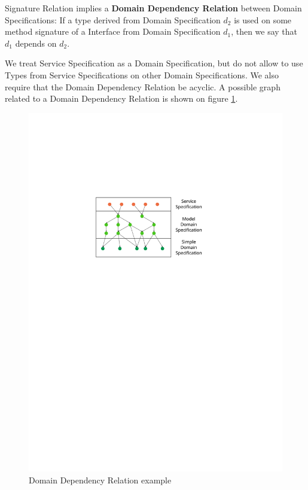 % 
% 

Signature Relation implies a \textbf{Domain Dependency Relation} between Domain Specifications: If a type derived from Domain Specification $d_2$ is used on some method signature of a Interface from Domain Specification $d_1$, then we say that $d_1$ depends on $d_2$.

We treat Service Specification as a Domain Specification, but do not allow to use Types from Service Specifications on other Domain Specifications. We also require that the Domain Dependency Relation be acyclic. A possible graph related to a Domain Dependency Relation is shown on figure \ref{fig:service}.

\begin{figure}[ht!]
 \centering
 \includegraphics[width=1\textwidth]{serviceSpec}
 \caption{Domain Dependency Relation example}
 \label{fig:service}
\end{figure}

